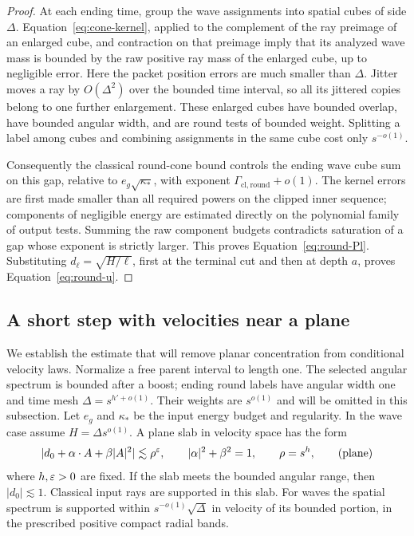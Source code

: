\begin{proof}
At each ending time, group the wave assignments into spatial cubes of
side $\Delta$.  Equation~\eqref{eq:cone-kernel}, applied to the
complement of the ray preimage of an enlarged cube, and contraction on
that preimage imply that its analyzed wave mass is bounded by the raw
positive ray mass of the enlarged cube, up to negligible error.
Here the packet position errors are much smaller than $\Delta$.
Jitter moves a ray by $O(\Delta^2)$ over the bounded time interval, so
all its jittered copies belong to one further enlargement.  These
enlarged cubes have bounded overlap, have bounded angular width, and
are round tests of bounded weight.  Splitting a label among cubes and
combining assignments in the same cube cost only $s^{-o(1)}$.

Consequently the classical round-cone bound controls the ending wave
cube sum on this gap, relative to $e_g\sqrt{\kappa_*}$, with exponent
$\Gamma_{\mathrm{cl},\mathrm{round}}+o(1)$.  The kernel errors are
first made smaller than all required powers on the clipped inner
sequence; components of negligible energy are estimated directly on
the polynomial family of output tests.  Summing the raw component
budgets contradicts saturation of a gap whose exponent is strictly
larger.  This proves Equation~\eqref{eq:round-Pl}.  Substituting
$d_{\ell}=\sqrt{H/\ell}$, first at the terminal cut and then at depth
$a$, proves Equation~\eqref{eq:round-u}.
\end{proof}

\subsection{A short step with velocities near a plane}

We establish the estimate that will remove planar concentration from
conditional velocity laws.  Normalize a free parent interval to length
one.  The selected angular spectrum is bounded after a boost; ending
round labels have angular width one and time mesh
$\Delta=s^{h'+o(1)}$.  Their weights are $s^{o(1)}$ and will be omitted
in this subsection.  Let $e_g$ and $\kappa_*$ be the input energy
budget and regularity.  In the wave case assume
$H=\Delta s^{o(1)}$.  A plane slab in velocity space has the form
\begin{equation}
 |d_0+\alpha\cdot A+\beta|A|^2|\lesssim\rho^\varepsilon,
 \qquad |\alpha|^2+\beta^2=1,
 \qquad \rho=s^h,
 \tag{plane}\label{eq:plane}
\end{equation}
where $h,\varepsilon>0$ are fixed.  If the slab meets the bounded angular
range, then $|d_0|\lesssim1$.  Classical input rays are supported in
this slab.  For waves the spatial spectrum is supported within
$s^{-o(1)}\sqrt\Delta$ in velocity of its bounded portion, in the
prescribed positive compact radial bands.


